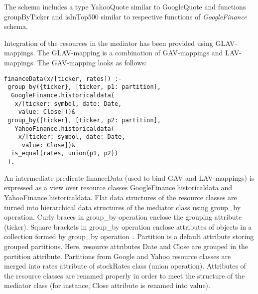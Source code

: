 \begin{multicols}{2}
\vspace*{-9pt}

{\small
  The schema includes a type {\sf YahooQuote} similar to {\sf GoogleQuote} and
functions {\sf groupByTicker} and {\sf isInTop500} similar to respective functions of
\textit{GoogleFinance} schema.

  Integration of the resources in the mediator has been provided using
  GLAV-mappings. The GLAV-mapping is a combination of GAV-mappings and
  LAV-mappings. The GAV-mapping looks as follows:}
{\small
  \begin{verbatim}
financeData(x/[ticker, rates]) :-
 group_by({ticker}, [ticker, p1: partition],
  GoogleFinance.historicaldata(
   x/[ticker: symbol, date: Date, 
    value: Close]))&
 group_by({ticker}, [ticker, p2: partition],
   YahooFinance.historicaldata(
    x/[ticker: symbol, date: Date, 
     value: Close])&
  is_equal(rates, union(p1, p2))
 ).
  \end{verbatim}
}
  



\vspace*{-9pt}

{\small

  An intermediate predicate {\sf financeData} (used to bind GAV and
  LAV-mappings) is expressed as a view over resource classes {\sf
GoogleFinance.historicaldata} and {\sf YahooFinance.historicaldata}. Flat data
structures of the resource classes are turned into hierarchical data structures of the
mediator class using {\sf group\_by} operation. Curly braces in {\sf group\_by}
operation enclose the grouping attribute ({\sf ticker}). Square brackets in {\sf
group\_by} operation enclose attributes of objects in a collection formed by {\sf
group\_by} operation~\cite{4-kal}. {\sf Partition} is a default attribute storing
grouped partitions. Here, resource attributes {\sf Date} and {\sf Close} are grouped in
the {\sf partition} attribute. Partitions from {\sf Google} and {\sf Yahoo} resource
classes are merged into {\sf rates} attribute of {\sf stockRates} class ({\sf union}
operation). Attributes of the resource classes are renamed properly in order to meet
the structure of the mediator class (for instance, {\sf Close} attribute is renamed into
{\sf value}).

 \begin{figure*}[b] %
    \vspace*{1pt}
 \begin{center}
 \mbox{%
 \epsfxsize=157.485mm
 }
 \end{center}
 \vspace*{-6pt}
  \label{f5-kal}
  \end{figure*}

}
\end{multicols}
